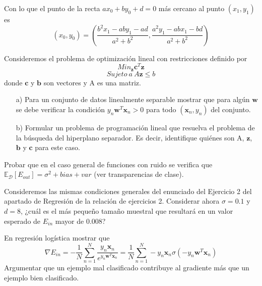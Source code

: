 \documentclass[12pt]{article}
\theoremstyle{definition}
\begin{document}
\begin{pregunta}
Con lo que el punto de la recta $ax_0+by_0+d=0$ más cercano al punto $(x_1,y_1)$ es
\[ (x_0,y_0) = (\frac{b^2x_1 - aby_1 -ad}{a^2+b^2}, \frac{a^2y_1 - abx_1 -bd}{a^2+b^2})	\]

\end{pregunta}

\begin{pregunta}
Consideremos el problema de optimización lineal con restricciones definido por 
\[	Min_{\mathbf{z}}\mathbf{c}^T\mathbf{z}	\]
\[	Sujeto\ a\ A\mathbf{z} \leq b	\]
donde $\mathbf{c}$ y $\mathbf{b}$ son vectores y A es una matriz.
\begin{enumerate}
\item[a)] Para un conjunto de datos linealmente separable mostrar que para algún $\mathbf{w}$ se debe verificar la condición $y_n\mathbf{w}^T\mathbf{x}_n > 0$ para todo $(\mathbf{x}_n, y_n)$ del conjunto.
\item[b)] Formular un problema de programación lineal que resuelva el problema de la búsqueda del hiperplano separador. Es decir, identifique quiénes son A, $\mathbf{z}$, $\mathbf{b}$ y $\mathbf{c}$ para este caso.
\end{enumerate}

\end{pregunta}

\begin{pregunta}
Probar que en el caso general de funciones con ruido se verifica que $\mathbb{E}_{\mathcal{D}}[E_{out}]=\sigma^2+bias+var$ (ver transparencias de clase).\\


\end{pregunta}

\begin{pregunta}
Consideremos las mismas condiciones generales del enunciado del Ejercicio 2 del apartado de Regresión de la relación de ejercicios 2. Considerar ahora $\sigma=0.1$ y $d=8$, ¿cuál es el más pequeño tamaño muestral que resultará en un valor esperado de $E_{in}$ mayor de 0.008?\\


\end{pregunta}

\begin{pregunta}
En regresión logística mostrar que 
\[
	\nabla E_{in} = -\frac{1}{N}\sum_{n=1}^N\frac{y_n\mathbf{x}_n}{e^{y_n\mathbf{w}^T\mathbf{x}_n}} = \frac{1}{N}\sum_{n=1}^N-y_n\mathbf{x}_n\sigma(-y_n\mathbf{w}^T\mathbf{x}_n)
\]
Argumentar que un ejemplo mal clasificado contribuye al gradiente más que un ejemplo bien clasificado.\\


\end{pregunta}
\end{document}
